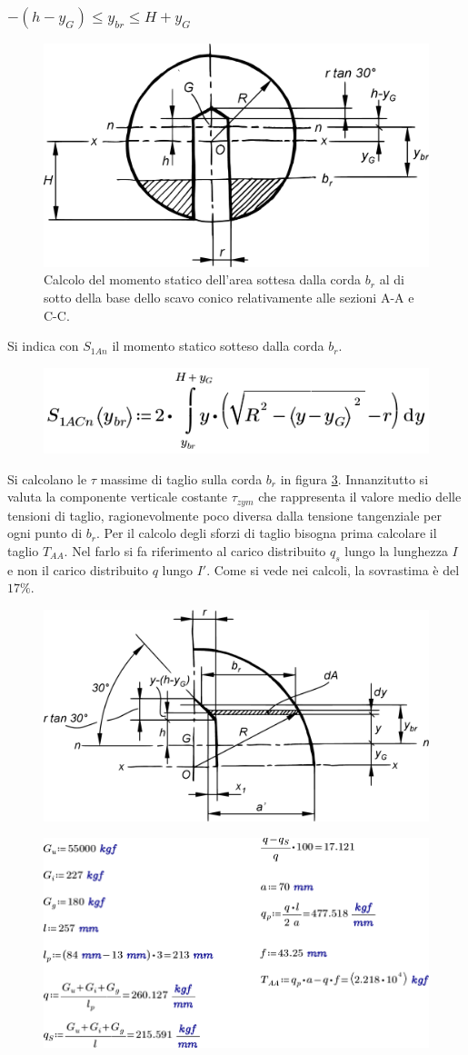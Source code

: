 \subsubsection{$-(h-y_G) \leq y_{br} \leq H+y_G$}
\begin{figure}[H]
\centering
  \includegraphics[width=.4\textwidth]{imgs/Cap7/SezAsse6}
\caption{Calcolo del momento statico dell'area sottesa dalla corda $b_r$ al di sotto della base dello scavo conico relativamente alle sezioni A-A e C-C.}
\label{fig:SezAsse6}
\end{figure}
Si indica con $S_{1An}$ il momento statico sotteso dalla corda $b_r$. 
\begin{figure}[H]
\centering
  \includegraphics[width=.4\textwidth]{imgs/MathAsse4_0}
\caption{}
\label{fig:MathAsse4_0}
\end{figure}
Si calcolano le $\tau$ massime di taglio sulla corda $b_r$ in figura \ref{fig:SezAsse7}.
Innanzitutto si valuta la componente verticale costante $\tau_{zym}$ che rappresenta il valore medio delle tensioni di taglio, ragionevolmente poco diversa dalla tensione tangenziale per ogni punto di $b_r$. 
Per il calcolo degli sforzi di taglio bisogna prima calcolare il taglio $T_{AA}$. Nel farlo si fa riferimento al carico distribuito $q_s$ lungo la lunghezza $I$ e non il carico distribuito $q$ lungo $I'$. Come si vede nei calcoli, la sovrastima è del $17\%$. 
\begin{figure}[H]
\centering
  \includegraphics[width=.45\textwidth]{imgs/Cap7/SezAsse7}
\caption{}
\label{fig:SezAsse7}
\end{figure}
\begin{figure}[H]
\centering
  \includegraphics[width=.65\textwidth]{imgs/MathAsse4}
\caption{}
\label{fig:MathAsse4}
\end{figure}
